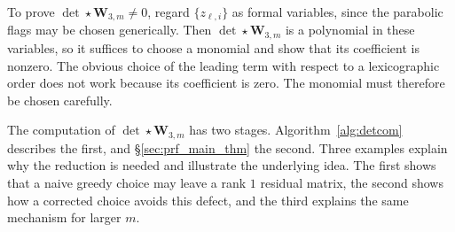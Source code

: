 \documentclass[12pt, letterpaper]{amsart}
\theoremstyle{definition}
\newcommand{\bW}{\mathbf{W} }
\begin{document}
To prove \(\det\star\bW_{3,m} \ne 0\), regard \(\{z_{\ell, i}\}\) as formal variables, since the parabolic flags may be chosen generically. Then \(\det \star\bW_{3,m}\) is a polynomial in these variables, so it suffices to choose a monomial and show that its coefficient is nonzero. The obvious choice of the leading term with respect to a lexicographic order does not work because its coefficient is zero. The monomial must therefore be chosen carefully.

The computation of \(\det \star \bW_{3,m}\) has two stages. Algorithm~\ref{alg:detcom} describes the first, and \S\ref{sec:prf_main_thm} the second. Three examples explain why the reduction is needed and illustrate the underlying idea. The first shows that a naive greedy choice may leave a rank \(1\) residual matrix, the second shows how a corrected choice avoids this defect, and the third explains the same mechanism for larger \(m\).
\end{document}
